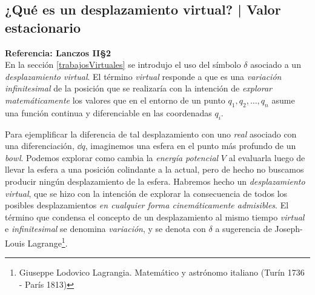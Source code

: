 \documentclass[12pt, spanish, a4paper, ]{article}
\begin{document}



\subsection{¿Qué es un desplazamiento virtual? | Valor estacionario}\label{desplazamientoVirtual}
\textbf{Referencia: Lanczos II\S2}\\

En la sección \ref{trabajosVirtuales} se introdujo el uso del símbolo \(\delta\) asociado a un \emph{desplazamiento virtual}.
El término \emph{virtual} responde a que es una \emph{variación infinitesimal} de la posición que se realizaría con la intención de \emph{explorar matemáticamente} los valores que en el entorno de un punto \(q_1, q_2, \ldots, q_n\) asume una función continua y diferenciable en las coordenadas \(q_i\).

Para ejemplificar la diferencia de tal desplazamiento con uno \emph{real} asociado con una diferenciación, \(\dd q\), imaginemos una esfera en el punto más profundo de un \emph{bowl}.
Podemos explorar como cambia la \emph{energía potencial} \(V\) al evaluarla luego de llevar la esfera a una posición colindante a la actual, pero de hecho no buscamos producir ningún desplazamiento de la esfera.
Habremos hecho un \emph{desplazamiento virtual}, que se hizo con la intención de explorar la consecuencia de todos los posibles desplazamientos \emph{en cualquier forma cinemáticamente admisibles}.
El término que condensa el concepto de un desplazamiento al mismo tiempo \emph{virtual} e \emph{infinitesimal} se denomina \emph{variación}, y se denota con \(\delta\) a sugerencia de Joseph-Louis Lagrange\footnote{Giuseppe Lodovico Lagrangia. Matemático y astrónomo italiano (Turín 1736 - París 1813)}.
\end{document}
